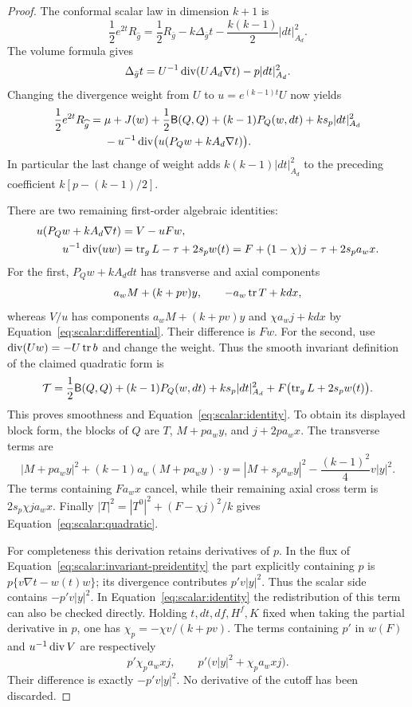 \begin{proof}
The conformal scalar law in dimension $k+1$ is
\[
 \frac12e^{2t}R_{\widehat g}
   =\frac12R_{\bar g}-k\Delta_{\bar g}t
                         -\frac{k(k-1)}2|dt|_{A_d}^2.
\]
The volume formula gives
\[
 \Delta_{\bar g}t
  =U^{-1}\operatorname{div}(UA_d\nabla t)-p|dt|_{A_d}^2.
\]
Changing the divergence weight from $U$ to
$u=e^{(k-1)t}U$ now yields
\begin{equation}
 \begin{aligned}
 \frac12e^{2t}R_{\widehat g}
  ={}&\mu+J(w)+\frac12\mathsf B(Q,Q)
     +(k-1)P_Q(w,dt)+ks_p|dt|_{A_d}^2\\
   &-u^{-1}\operatorname{div}\bigl(u(P_Qw+kA_d\nabla t)\bigr).
 \end{aligned}
 \label{eq:scalar:invariant-preidentity}
\end{equation}
In particular the last change of weight adds
$k(k-1)|dt|_{A_d}^2$ to the preceding coefficient
$k[p-(k-1)/2]$.

There are two remaining first-order algebraic identities:
\begin{equation}
 \begin{aligned}
 u(P_Qw+kA_d\nabla t)&=V-uFw,\\
 u^{-1}\operatorname{div}(uw)&=\operatorname{tr}_gL-\tau+2s_pw(t)
                  =F+(1-\chi)j-\tau+2s_pa_wx.
 \end{aligned}
 \label{eq:scalar:flux-relations}
\end{equation}
For the first, $P_Qw+kA_ddt$ has transverse and axial components
\[
 a_wM+(k+pv)y,\qquad -a_w\operatorname{tr} T+kd x,
\]
whereas $V/u$ has components
$a_wM+(k+pv)y$ and $\chi a_wj+kd x$ by
Equation~\eqref{eq:scalar:differential}.  Their difference is $Fw$.
For the second, use $\operatorname{div}(Uw)=-U\operatorname{tr} b$ and change the weight.
Thus the smooth invariant definition of the claimed quadratic form is
\begin{equation}
 \mathcal T=\frac12\mathsf B(Q,Q)+(k-1)P_Q(w,dt)
        +ks_p|dt|_{A_d}^2+F\bigl(\operatorname{tr}_gL+2s_pw(t)\bigr).
 \label{eq:scalar:invariant-quadratic}
\end{equation}
This proves smoothness and Equation~\eqref{eq:scalar:identity}.
To obtain its displayed block form, the blocks of $Q$ are
$T$, $M+pa_wy$, and $j+2pa_wx$.  The transverse terms are
\[
 |M+pa_wy|^2+(k-1)a_w(M+pa_wy)\cdot y
 =|M+s_pa_wy|^2-\frac{(k-1)^2}{4}v|y|^2.
\]
The terms containing $F a_wx$ cancel, while their remaining axial
cross term is $2s_p\chi ja_wx$.  Finally
$|T|^2=|T^0|^2+(F-\chi j)^2/k$ gives
Equation~\eqref{eq:scalar:quadratic}.

For completeness this derivation retains derivatives of $p$.
In the flux of Equation~\eqref{eq:scalar:invariant-preidentity} the
part explicitly containing $p$ is
$p\{v\nabla t-w(t)w\}$; its divergence contributes
$p'v|y|^2$.  Thus the scalar side contains $-p'v|y|^2$.
In Equation~\eqref{eq:scalar:identity} the redistribution of this term
can also be checked directly.  Holding $t,dt,df,H^f,K$ fixed when taking
the partial derivative in $p$, one has
$\chi_p=-\chi v/(k+pv)$.  The terms containing $p'$ in $w(F)$ and
$u^{-1}\operatorname{div} V$ are respectively
\[
 p'\chi_p a_wxj,
 \qquad p'\bigl(v|y|^2+\chi_p a_wxj\bigr).
\]
Their difference is exactly $-p'v|y|^2$.  No derivative of the cutoff
has been discarded.
\end{proof}

